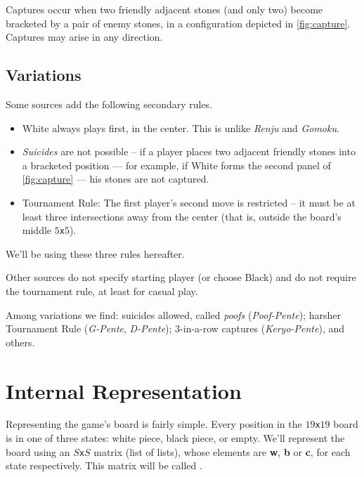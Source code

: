 \documentclass[12pt,a4paper,notitlepage]{article}
\newcommand*{\boardsize}[1]{$#1$\texttt{x}$#1$}
\begin{document}
Captures occur when two friendly adjacent stones (and only two) become bracketed by a pair of enemy stones, in a configuration depicted in \autoref{fig:capture}. Captures may arise in any direction.

\subsection{Variations}
\label{subsec:variations}

Some sources add the following secondary rules.

\begin{itemize}
	\item White always plays first, in the center.\supercite{pente-renjunu, pente-wikipedia} This is unlike \textit{Renju} and \textit{Gomoku}.
	\item \textsl{Suicides} are not possible -- if a player places two adjacent friendly stones into a bracketed position --- for example, if White forms the second panel of \autoref{fig:capture} --- his stones are not captured.\supercite{pente-renjunu,pente-org,pente-wikipedia,pente-winning-moves}
	\item Tournament Rule: The first player's second move is restricted -- it must be at least three intersections away from the center (that is, outside the board's middle \boardsize{5}).\supercite{pente-net,pente-org,pente-wikipedia,pente-winning-moves}
\end{itemize}

We'll be using these three rules hereafter.

Other sources do not specify starting player (or choose Black) and do not require the tournament rule, at least for casual play. 

Among variations we find: suicides allowed, called \textit{poofs} (\textit{Poof-Pente}); harsher Tournament Rule (\textit{G-Pente}, \textit{D-Pente}); 3-in-a-row captures (\textit{Keryo-Pente}), and others.\supercite{pente-org,pente-net}

\section{Internal Representation}
\label{sec:internal}

Representing the game's board is fairly simple.
Every position in the \boardsize{19} board is in one of three states:
white piece, black piece, or empty. We'll represent the board using
an \boardsize{S} matrix (list of lists), whose elements are \textbf{w},
\textbf{b} or \textbf{c}, for each state respectively.
This matrix will be called .
\end{document}

